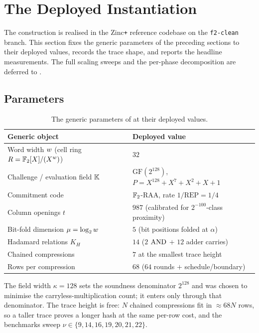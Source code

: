 \section{The Deployed Instantiation}
\label{sec:impl}

The construction is realised in the Zinc\texttt{+} reference codebase on the
\texttt{f2-clean} branch. This section fixes the generic parameters of the
preceding sections to their deployed values, records the trace shape, and
reports the headline measurements. The full scaling sweeps and the per-phase
decomposition are deferred to .

\subsection{Parameters}
\label{sec:impl-params}

\begin{table}[h]
\centering
\renewcommand{\arraystretch}{1.2}
\begin{tabular}{l l}
\toprule
Generic object & Deployed value \\
\midrule
Word width $w$ (cell ring $R = \mathbb{F}_2[X]/(X^{w})$) & $32$ \\
Challenge / evaluation field $\mathbb{K}$ & $\mathrm{GF}(2^{128})$, $P = X^{128}+X^7+X^2+X+1$ \\
Commitment code & $\mathbb{F}_2$-RAA, rate $1/\mathrm{REP} = 1/4$ \\
Column openings $t$ & $987$ (calibrated for $2^{-100}$-class proximity) \\
Bit-fold dimension $\mu = \log_2w$ & $5$ (bit positions folded at $\alpha$) \\
Hadamard relations $K_H$ & $14$ ($2$ $\operatorname{AND}$ $+$ $12$ adder carries) \\
Chained compressions & $7$ at the smallest trace height \\
Rows per compression & $68$ ($64$ rounds $+$ schedule/boundary) \\
\bottomrule
\end{tabular}
\caption{The generic parameters of
 at their deployed values.}
\end{table}

The field width $\kappa = 128$ sets the soundness denominator $2^{128}$ and was
chosen to minimise the carryless-multiplication count; it enters 
only through that denominator. The trace height is free: $N$ chained
compressions fit in $\approx 68N$ rows, so a taller trace proves a longer hash at
the same per-row cost, and the benchmarks sweep
$\nu\in\{9,14,16,19,20,21,22\}$.

